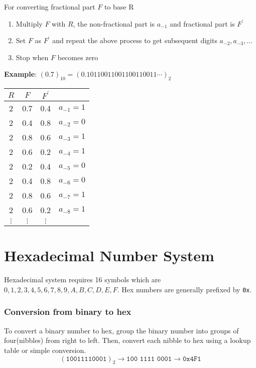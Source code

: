 \documentclass[oneside]{book}
\begin{document}
\noindent For converting fractional part \(F\) to base R
\begin{enumerate}
	\item Multiply \(F\) with \(R\), the non-fractional part is \(a_{-1}\) and fractional part is \(F^\prime\)
	\item Set \(F\) as \(F^\prime\) and repeat the above process to get subsequent digits \(a_{-2}, a_{-3}, \ldots\)
	\item Stop when \(F\) becomes zero
\end{enumerate}
\textbf{Example}: \((0.7)_{10} = (0.10110011001100110011\cdots)_2\)
\begin{center}
	\begin{tabular}{|cccl|}
		\hline
		\(R\)      & \(F\)      & \(F^\prime\) &                \\
		\hline
		2          & 0.7        & 0.4          & \(a_{-1} = 1\) \\
		2          & 0.4        & 0.8          & \(a_{-2} = 0\) \\
		2          & 0.8        & 0.6          & \(a_{-3} = 1\) \\
		2          & 0.6        & 0.2          & \(a_{-4} = 1\) \\
		2          & 0.2        & 0.4          & \(a_{-5} = 0\) \\
		2          & 0.4        & 0.8          & \(a_{-6} = 0\) \\
		2          & 0.8        & 0.6          & \(a_{-7} = 1\) \\
		2          & 0.6        & 0.2          & \(a_{-8} = 1\) \\
		\(\vdots\) & \(\vdots\) & \(\vdots\)   &                \\
		\hline
	\end{tabular}
\end{center}


\section{Hexadecimal Number System}
Hexadecimal system requires 16 symbols which are \(0, 1, 2, 3, 4, 5, 6, 7, 8, 9, A, B, C, D, E, F\). Hex numbers are generally prefixed by \texttt{0x}.

\subsubsection{Conversion from binary to hex}
To convert a binary number to hex, group the binary number into groups of four(nibbles) from right to left. Then, convert each nibble to hex using a lookup table or simple conversion.
\[
	(\texttt{10011110001})_2 \longrightarrow \texttt{100\ 1111\ 0001} \longrightarrow \texttt{0x4F1}
\]
\end{document}
